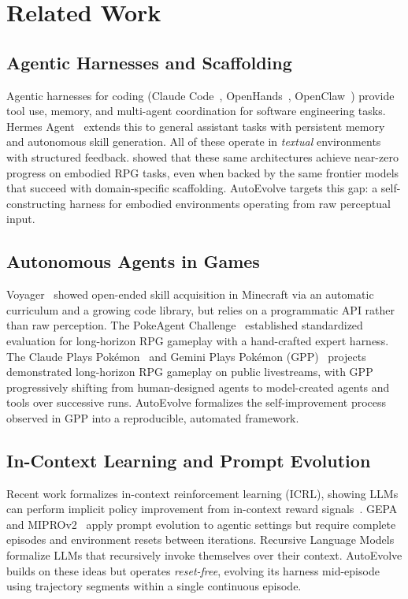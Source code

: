 \section{Related Work}\label{sec:related_work}

\subsection{Agentic Harnesses and Scaffolding}

Agentic harnesses for coding (Claude Code~\citep{anthropic2025claudecode}, OpenHands~\citep{wang2024openhands}, OpenClaw~\citep{steinberger2025openclaw}) provide tool use, memory, and multi-agent coordination for software engineering tasks. Hermes Agent~\citep{nousresearch2026hermes} extends this to general assistant tasks with persistent memory and autonomous skill generation. All of these operate in \emph{textual} environments with structured feedback. \citet{karten2025pokeagent} showed that these same architectures achieve near-zero progress on embodied RPG tasks, even when backed by the same frontier models that succeed with domain-specific scaffolding. AutoEvolve targets this gap: a self-constructing harness for embodied environments operating from raw perceptual input.

\subsection{Autonomous Agents in Games}

Voyager~\citep{wang2023voyager} showed open-ended skill acquisition in Minecraft via an automatic curriculum and a growing code library, but relies on a programmatic API rather than raw perception. The PokeAgent Challenge~\citep{karten2025pokeagent} established standardized evaluation for long-horizon RPG gameplay with a hand-crafted expert harness. The Claude Plays Pok\'{e}mon~\citep{anthropic2025claudeplays} and Gemini Plays Pok\'{e}mon (GPP)~\citep{zhang2025gpp} projects demonstrated long-horizon RPG gameplay on public livestreams, with GPP progressively shifting from human-designed agents to model-created agents and tools over successive runs. AutoEvolve formalizes the self-improvement process observed in GPP into a reproducible, automated framework.

\subsection{In-Context Learning and Prompt Evolution}

Recent work formalizes in-context reinforcement learning (ICRL), showing LLMs can perform implicit policy improvement from in-context reward signals~\citep{song2025icrl, karten2025economist}. GEPA~\citep{agrawal2025gepa} and MIPROv2~\citep{opsahlong2024miprov2} apply prompt evolution to agentic settings but require complete episodes and environment resets between iterations. Recursive Language Models~\citep{zhang2025rlm} formalize LLMs that recursively invoke themselves over their context. AutoEvolve builds on these ideas but operates \emph{reset-free}, evolving its harness mid-episode using trajectory segments within a single continuous episode.
